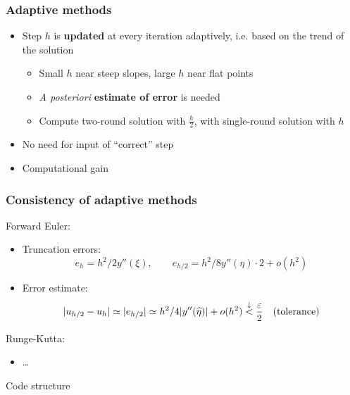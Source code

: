 \documentclass{beamer}
\begin{document}
\begin{frame} %
	\frametitle{Adaptive methods}
	\begin{itemize}
		\item Step $h$ is \textbf{updated} at every iteration adaptively, i.e. based on the trend of the solution
		\begin{itemize}
			\item Small $h$ near steep slopes, large $h$ near flat points
			\item \textit{A posteriori} \textbf{estimate of error} is needed
			\item Compute two-round solution with $\frac{h}{2}$, with single-round solution with $h$
		\end{itemize}
		\item No need for input of ``correct'' step
		\item Computational gain
	\end{itemize}
\end{frame}


\begin{frame} %
	\frametitle{Consistency of adaptive methods}
	Forward Euler:
	\begin{itemize}
		\item Truncation errors:
		$$ e_h = h^2/2 y''(\xi), \qquad e_{h/2} = h^2/8 y''(\eta) \cdot 2 + o(h^2) $$
		\item Error estimate:
		$$ \lvert u_{h/2} - u_h\rvert \simeq \lvert e_{h/2}\rvert \simeq h^2/4 \lvert y''(\widehat\eta)\rvert
		+ o(h^2) \stackrel{\downarrow}{<} \frac{\varepsilon}{2}
		\quad \text{(tolerance)} $$
	\end{itemize}
	\pause
	Runge-Kutta:
	\begin{itemize}
		\item \dots %
	\end{itemize}
\end{frame}


\begin{frame}[c] %
\begin{center}
	\Huge \color{blue} Code structure
\end{center}
\end{frame}
\end{document}
